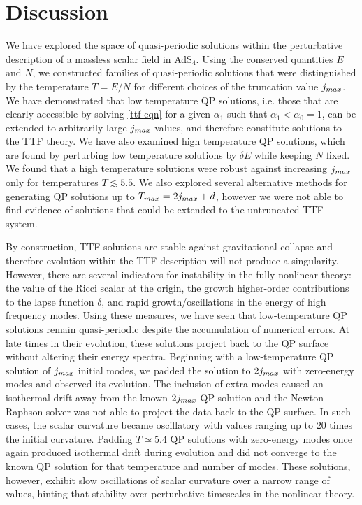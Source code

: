 \documentclass[../PhD.tex]{subfiles}
\begin{document}

\section{Discussion}
\label{sec: ttf discussion}

We have explored the space of quasi-periodic solutions within the perturbative description of a massless scalar field in AdS$_4$. Using the conserved quantities $E$ and $N$, we constructed families of quasi-periodic solutions that were distinguished by the temperature $T = E/N$ for different choices of the truncation value $j_{max}$. We have demonstrated that low temperature QP solutions, i.e. those that are clearly accessible by solving \eqref{ttf eqn} for a given $\alpha_1$ such that $\alpha_1 < \alpha_0 = 1$, can be extended to arbitrarily large $j_{max}$ values, and therefore constitute solutions to the TTF theory. We have also examined high temperature QP solutions, which are found by perturbing low temperature solutions by $\delta E$ while keeping $N$ fixed. We found that a high temperature solutions were robust against increasing $j_{max}$ only for temperatures $T \lesssim 5.5$. We also explored several alternative methods for generating QP solutions up to $T_{max} = 2j_{max} + d$, however we were not able to find evidence of solutions that could be extended to the untruncated TTF system.

By construction, TTF solutions are stable against gravitational collapse and therefore evolution within the TTF description will not produce a singularity. However, there are several indicators for instability in the fully nonlinear theory: the value of the Ricci scalar at the origin, the growth higher-order contributions to the lapse function $\delta$, and rapid growth/oscillations in the energy of high frequency modes. Using these measures, we have seen that low-temperature QP solutions remain quasi-periodic despite the accumulation of numerical errors. At late times in their evolution, these solutions project back to the QP surface without altering their energy spectra. Beginning with a low-temperature QP solution of $j_{max}$ initial modes, we padded the solution to $2j_{max}$ with zero-energy modes and observed its evolution. The inclusion of extra modes caused an isothermal drift away from the known $2j_{max}$ QP solution and the Newton-Raphson solver was not able to project the data back to the QP surface. In such cases, the scalar curvature became oscillatory with values ranging up to $20$ times the initial curvature. Padding $T \simeq 5.4$ QP solutions with zero-energy modes once again produced isothermal drift during evolution and did not converge to the known QP solution for that temperature and number of modes. These solutions, however, exhibit slow oscillations of scalar curvature over a narrow range of values, hinting that stability over perturbative timescales in the nonlinear theory. 
\end{document}
